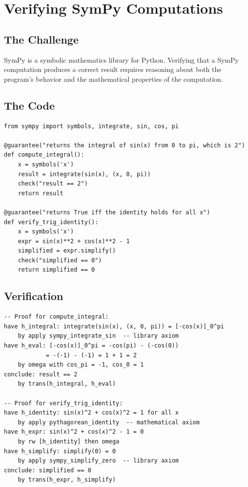 \documentclass[11pt,a4paper]{report}
\theoremstyle{definition}
\theoremstyle{plain}
\begin{document}
\chapter{Verifying SymPy Computations}
\label{ch:case-sympy}

\section{The Challenge}

SymPy is a symbolic mathematics library for Python. Verifying that a SymPy
computation produces a correct result requires reasoning about both the
program's behavior and the mathematical properties of the computation.

\section{The Code}

\begin{lstlisting}[style=synhopy]
from sympy import symbols, integrate, sin, cos, pi

@guarantee("returns the integral of sin(x) from 0 to pi, which is 2")
def compute_integral():
    x = symbols('x')
    result = integrate(sin(x), (x, 0, pi))
    check("result == 2")
    return result

@guarantee("returns True iff the identity holds for all x")
def verify_trig_identity():
    x = symbols('x')
    expr = sin(x)**2 + cos(x)**2 - 1
    simplified = expr.simplify()
    check("simplified == 0")
    return simplified == 0
\end{lstlisting}

\section{Verification}

\begin{lstlisting}[style=proof]
-- Proof for compute_integral:
have h_integral: integrate(sin(x), (x, 0, pi)) = [-cos(x)]_0^pi
    by apply sympy_integrate_sin  -- library axiom
have h_eval: [-cos(x)]_0^pi = -cos(pi) - (-cos(0))
            = -(-1) - (-1) = 1 + 1 = 2
    by omega with cos_pi = -1, cos_0 = 1
conclude: result == 2
    by trans(h_integral, h_eval)

-- Proof for verify_trig_identity:
have h_identity: sin(x)^2 + cos(x)^2 = 1 for all x
    by apply pythagorean_identity  -- mathematical axiom
have h_expr: sin(x)^2 + cos(x)^2 - 1 = 0
    by rw [h_identity] then omega
have h_simplify: simplify(0) = 0
    by apply sympy_simplify_zero  -- library axiom
conclude: simplified == 0
    by trans(h_expr, h_simplify)
\end{lstlisting}
\end{document}
